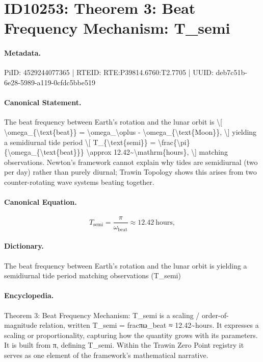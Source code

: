 \section*{ID10253: Theorem 3: Beat Frequency Mechanism: T\_semi}
\paragraph{Metadata.}
PiID: 4529244077365 | RTEID: RTE:P39814.6760:T2.7705 | UUID: deb7c51b-6e28-5989-a119-0cfdc5bbe519

\paragraph{Canonical Statement.}
The beat frequency between Earth's rotation and the lunar orbit is \textbackslash{}[ \textbackslash{}omega\_\{\textbackslash{}text\{beat\}\} = \textbackslash{}omega\_\textbackslash{}oplus - \textbackslash{}omega\_\{\textbackslash{}text\{Moon\}\}, \textbackslash{}] yielding a semidiurnal tide period \textbackslash{}[ T\_\{\textbackslash{}text\{semi\}\} = \textbackslash{}frac\{\textbackslash{}pi\}\{\textbackslash{}omega\_\{\textbackslash{}text\{beat\}\}\} \textbackslash{}approx 12.42\textasciitilde{}\textbackslash{}mathrm\{hours\}, \textbackslash{}] matching observations. Newton's framework cannot explain why tides are semidiurnal (two per day) rather than purely diurnal; Trawin Topology shows this arises from two counter-rotating wave systems beating together.

\paragraph{Canonical Equation.}
\[
T_{\text{semi}} = \frac{\pi}{\omega_{\text{beat}}} \approx 12.42~\mathrm{hours},
\]

\paragraph{Dictionary.}
The beat frequency between Earth's rotation and the lunar orbit is yielding a semidiurnal tide period matching observations (T\_semi)

\paragraph{Encyclopedia.}
Theorem 3: Beat Frequency Mechanism: T\_semi is a scaling / order-of-magnitude relation, written T\_semi = fracπω\_beat ≈ 12.42\textasciitilde{}hours. It expresses a scaling or proportionality, capturing how the quantity grows with its parameters. It is built from π, defining T\_semi. Within the Trawin Zero Point registry it serves as one element of the framework's mathematical narrative.
